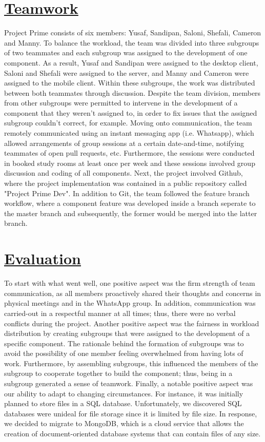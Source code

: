 \documentclass{article}
\begin{document}
\section{\underline{Teamwork}}
Project Prime consists of six members: Yusaf, Sandipan, Saloni, Shefali, Cameron and Manny. To balance the workload, the team was divided into three subgroups of two teammates and each subgroup was assigned to the development of one component. As a result, Yusaf and Sandipan were assigned to the desktop client, Saloni and Shefali were assigned to the server, and Manny and Cameron were assigned to the mobile client. Within these subgroups, the work was distributed between both teammates through discussion. Despite the team division, members from other subgroups were permitted to intervene in the development of a component that they weren't assigned to, in order to fix issues that the assigned subgroup couldn't correct, for example. Moving onto communication, the team remotely communicated using an instant messaging app (i.e. Whatsapp), which allowed arrangements of group sessions at a certain date-and-time, notifying teammates of open pull requests, etc. Furthermore, the sessions were conducted in booked study rooms at least once per week and these sessions involved group discussion and coding of all components. Next, the project involved Github, where the project implementation was contained in a public repository called "Project Prime Dev". In addition to Git, the team followed the feature branch workflow, where a component feature was developed inside a branch seperate to the master branch and subsequently, the former would be merged into the latter branch.

\section{\underline{Evaluation}}
To start with what went well, one positive aspect was the firm strength of team communication, as all members proactively shared their thoughts and concerns in physical meetings and in the WhatsApp group. In addition, communication was carried-out in a respectful manner at all times; thus, there were no verbal conflicts during the project. Another positive aspect was the fairness in workload distribution by creating subgroups that were assigned to the development of a specific component. The rationale behind the formation of subgroups was to avoid the possibility of one member feeling overwhelmed from having lots of work. Furthermore, by assembling subgroups, this influenced the members of the subgroup to cooperate together to build the component; thus, being in a subgroup generated a sense of teamwork. Finally, a notable positive aspect was our ability to adapt to changing circumstances. For instance, it was initially planned to store files in a SQL database. Unfortunately, we discovered SQL databases were unideal for file storage since it is limited by file size. In response, we decided to migrate to MongoDB, which is a cloud service that allows the creation of document-oriented database systems that can contain files of any size. 
\end{document}
